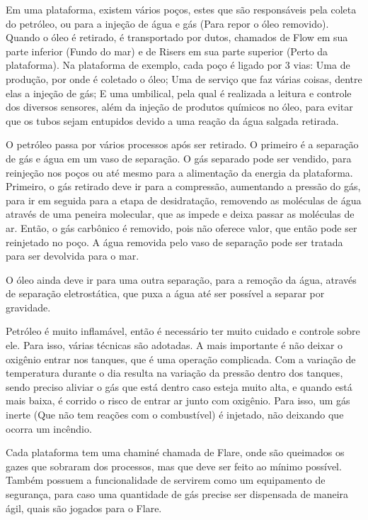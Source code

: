 \documentclass{article}
\begin{document}
Em uma plataforma, existem vários poços, estes que são responsáveis pela coleta do petróleo, ou para a injeção de água e gás (Para repor o óleo removido). Quando o óleo é retirado, é transportado por dutos, chamados de Flow em sua parte inferior (Fundo do mar) e de Risers em sua parte superior (Perto da plataforma). Na plataforma de exemplo, cada poço é ligado por 3 vias: Uma de produção, por onde é coletado o óleo; Uma de serviço que faz várias coisas, dentre elas a injeção de gás; E uma umbilical, pela qual é realizada a leitura e controle dos diversos sensores, além da injeção de produtos químicos no óleo, para evitar que os tubos sejam entupidos devido a uma reação da água salgada retirada. 

O petróleo passa por vários processos após ser retirado. O primeiro é a separação de gás e água em um vaso de separação. O gás separado pode ser vendido, para reinjeção nos poços ou até mesmo para a alimentação da energia da plataforma. Primeiro, o gás retirado deve ir para a compressão, aumentando a pressão do gás, para ir em seguida para a etapa de desidratação, removendo as moléculas de água através de uma peneira molecular, que as impede e deixa passar as moléculas de ar. Então, o gás carbônico é removido, pois não oferece valor, que então pode ser reinjetado no poço. A água removida pelo vaso de separação pode ser tratada para ser devolvida para o mar. 

O óleo ainda deve ir para uma outra separação, para a remoção da água, através de separação eletrostática, que puxa a água até ser possível a separar por gravidade. 

Petróleo é muito inflamável, então é necessário ter muito cuidado e controle sobre ele. Para isso, várias técnicas são adotadas. A mais importante é não deixar o oxigênio entrar nos tanques, que é uma operação complicada. Com a variação de temperatura durante o dia resulta na variação da pressão dentro dos tanques, sendo preciso aliviar o gás que está dentro caso esteja muito alta, e quando está mais baixa, é corrido o risco de entrar ar junto com oxigênio. Para isso, um gás inerte (Que não tem reações com o combustível) é injetado, não deixando que ocorra um incêndio. 

Cada plataforma tem uma chaminé chamada de Flare, onde são queimados os gazes que sobraram dos processos, mas que deve ser feito ao mínimo possível. Também possuem a funcionalidade de servirem como um equipamento de segurança, para caso uma quantidade de gás precise ser dispensada de maneira ágil, quais são jogados para o Flare. 
\end{document}
